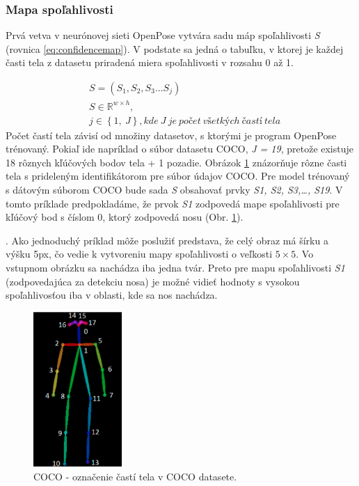 \documentclass[slovak,master,dept460,male,cpp,cpdeclaration]{diploma}
\begin{document}
\subsubsection{Mapa spoľahlivosti}
Prvá vetva v neurónovej sieti OpenPose vytvára sadu máp spoľahlivosti \textit{S} (rovnica \ref{eq:confidencemap}). V podstate sa jedná o tabuľku, v ktorej je každej časti tela z datasetu priradená miera spoľahlivosti v rozsahu 0 až 1. 

\begin{eqnarray}
& S = (S_{1}, S_{2}, S_{3} ... S_{j}) \label{eq:confidencemap}\\
& S\in\mathbb{R}^{w \times  h},\nonumber\\
& j\in \left \{1,\: J  \right \}, kde\: J\: je\: počet\: všetkých\: častí\: tela\nonumber
\end{eqnarray}
Počet častí tela závisí od množiny datasetov, s ktorými je program OpenPose trénovaný. Pokiaľ ide napríklad o súbor datasetu COCO\cite{lin2014microsoft}, \textit{J = 19}, pretože existuje 18 rôznych kľúčových bodov tela + 1 pozadie. Obrázok \ref{fig:cocoDataset} znázorňuje rôzne časti tela s prideleným identifikátorom pre súbor údajov COCO. Pre model trénovaný s dátovým súborom COCO bude sada \textit{S} obsahovať prvky \textit{S1, S2, S3,…, S19}. V tomto príklade predpokladáme, že prvok \textit{S1} zodpovedá mape spoľahlivosti pre kľúčový bod s číslom 0, ktorý zodpovedá nosu (Obr. \ref{fig:cocoDataset}).\par. Ako jednoduchý príklad môže poslužiť predstava, že celý obraz má šírku a výšku 5px, čo vedie k vytvoreniu  mapy spoľahlivosti o veľkosti \textit{$5\times 5$}. Vo vstupnom obrázku sa nachádza iba jedna tvár. Preto pre mapu spoľahlivosti \textit{S1} (zodpovedajúca za detekciu nosa) je možné vidieť hodnoty s vysokou spoľahlivosťou iba v oblasti, kde sa nos nachádza.\bigskip

\begin{figure}[H]
	\centering
	\includegraphics[width=0.3\textwidth]{Figures/cocoDataset.png}
	\caption{COCO - označenie častí tela v COCO datasete.\cite{cocoDataset}}
	\label{fig:cocoDataset}
\end{figure}
\end{document}

